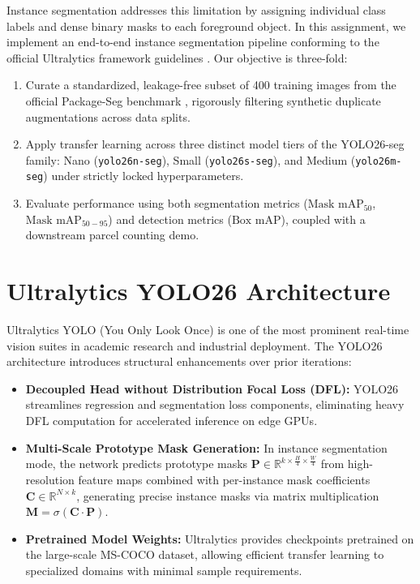 \documentclass[conference]{IEEEtran}
\begin{document}
Instance segmentation addresses this limitation by assigning individual class labels and dense binary masks to each foreground object. In this assignment, we implement an end-to-end instance segmentation pipeline conforming to the official Ultralytics framework guidelines \cite{ultralytics}. Our objective is three-fold:
\begin{enumerate}
    \item Curate a standardized, leakage-free subset of 400 training images from the official Package-Seg benchmark \cite{packageseg_roboflow}, rigorously filtering synthetic duplicate augmentations across data splits.
    \item Apply transfer learning across three distinct model tiers of the YOLO26-seg family: Nano (\texttt{yolo26n-seg}), Small (\texttt{yolo26s-seg}), and Medium (\texttt{yolo26m-seg}) under strictly locked hyperparameters.
    \item Evaluate performance using both segmentation metrics ($\text{Mask mAP}_{50}$, $\text{Mask mAP}_{50-95}$) and detection metrics ($\text{Box mAP}$), coupled with a downstream parcel counting demo.
\end{enumerate}

\section{Ultralytics YOLO26 Architecture}
Ultralytics YOLO (You Only Look Once) is one of the most prominent real-time vision suites in academic research and industrial deployment. The YOLO26 architecture introduces structural enhancements over prior iterations:
\begin{itemize}
    \item \textbf{Decoupled Head without Distribution Focal Loss (DFL):} YOLO26 streamlines regression and segmentation loss components, eliminating heavy DFL computation for accelerated inference on edge GPUs.
    \item \textbf{Multi-Scale Prototype Mask Generation:} In instance segmentation mode, the network predicts prototype masks $\mathbf{P} \in \mathbb{R}^{k \times \frac{H}{4} \times \frac{W}{4}}$ from high-resolution feature maps combined with per-instance mask coefficients $\mathbf{C} \in \mathbb{R}^{N \times k}$, generating precise instance masks via matrix multiplication $\mathbf{M} = \sigma(\mathbf{C} \cdot \mathbf{P})$.
    \item \textbf{Pretrained Model Weights:} Ultralytics provides checkpoints pretrained on the large-scale MS-COCO dataset, allowing efficient transfer learning to specialized domains with minimal sample requirements.
\end{itemize}
\end{document}
